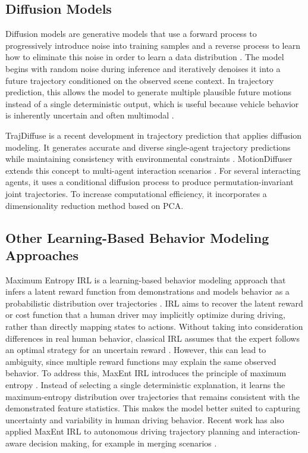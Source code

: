 \subsection{Diffusion Models}
Diffusion models are generative models that use a forward process to progressively introduce noise into training samples and a reverse process to 
learn how to eliminate this noise in order to learn a data distribution \cite{ho2020denoisingdiffusionprobabilisticmodels}. 
The model begins with random noise during inference and iteratively denoises it into a future trajectory conditioned on the observed scene context. 
In trajectory prediction, this allows the model to generate multiple plausible future motions instead of a single deterministic output, which is useful 
because vehicle behavior is inherently uncertain and often multimodal \cite{peng2025diffusionmodelsintelligenttransportation,AdvancedDiffusion}. 

\par TrajDiffuse is a recent development in trajectory prediction that applies diffusion modeling. It generates
accurate and diverse single-agent trajectory predictions while maintaining consistency with environmental
constraints \cite{10.1007/978-3-031-78110-0_25}. MotionDiffuser extends this concept to multi-agent interaction scenarios \cite{jiang2023motiondiffusercontrollablemultiagentmotion}. 
For several interacting agents, it uses a conditional diffusion process to produce permutation-invariant joint trajectories.
To increase computational efficiency, it incorporates a dimensionality reduction method based on \ac{PCA}.

\subsection{Other Learning-Based Behavior Modeling Approaches}
Maximum Entropy \ac{IRL} is a learning-based behavior modeling approach that infers a latent reward 
function from demonstrations and models behavior as a probabilistic distribution over trajectories \cite{ARORA2021103500,10.5555/1620270.1620297}.  
\ac{IRL} aims to recover the latent reward or cost function
that a human driver may implicitly optimize during driving, rather than directly mapping states to actions. 
Without taking into consideration differences in real human behavior, classical \ac{IRL} assumes that the expert follows an optimal strategy for an uncertain 
reward \cite{10.5555/645529.657801}. However, this can lead to ambiguity, since multiple reward functions
may explain the same observed behavior. To address this, 
\ac{MaxEnt IRL} introduces the principle of maximum entropy \cite{10.5555/1620270.1620297}. Instead of selecting a single deterministic explanation,
it learns the maximum-entropy distribution over trajectories that remains consistent with the demonstrated feature statistics. 
This makes the model better suited to capturing uncertainty and variability in human driving behavior. 
Recent work has also applied \ac{MaxEnt IRL} to autonomous driving trajectory planning and interaction-aware decision making, 
for example in merging scenarios \cite{10.1109/TITS.2024.3363497}.



